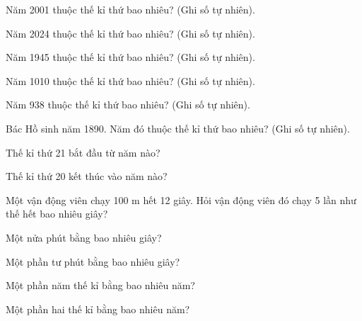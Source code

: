 \begin{ex}
Năm 2001 thuộc thế kỉ thứ bao nhiêu? (Ghi số tự nhiên).
\end{ex}

\begin{ex}
Năm 2024 thuộc thế kỉ thứ bao nhiêu? (Ghi số tự nhiên).
\end{ex}

\begin{ex}
Năm 1945 thuộc thế kỉ thứ bao nhiêu? (Ghi số tự nhiên).
\end{ex}

\begin{ex}
Năm 1010 thuộc thế kỉ thứ bao nhiêu? (Ghi số tự nhiên).
\end{ex}

\begin{ex}
Năm 938 thuộc thế kỉ thứ bao nhiêu? (Ghi số tự nhiên).
\end{ex}

\begin{ex}
Bác Hồ sinh năm 1890. Năm đó thuộc thế kỉ thứ bao nhiêu? (Ghi số tự nhiên).
\end{ex}

\begin{ex}
Thế kỉ thứ 21 bắt đầu từ năm nào?
\end{ex}

\begin{ex}
Thế kỉ thứ 20 kết thúc vào năm nào?
\end{ex}

\begin{ex}
Một vận động viên chạy 100 m hết 12 giây. Hỏi vận động viên đó chạy 5 lần như thế hết bao nhiêu giây?
\end{ex}

\begin{ex}
Một nửa phút bằng bao nhiêu giây?
\end{ex}

\begin{ex}
Một phần tư phút bằng bao nhiêu giây?
\end{ex}

\begin{ex}
Một phần năm thế kỉ bằng bao nhiêu năm?
\end{ex}

\begin{ex}
Một phần hai thế kỉ bằng bao nhiêu năm?
\end{ex}
